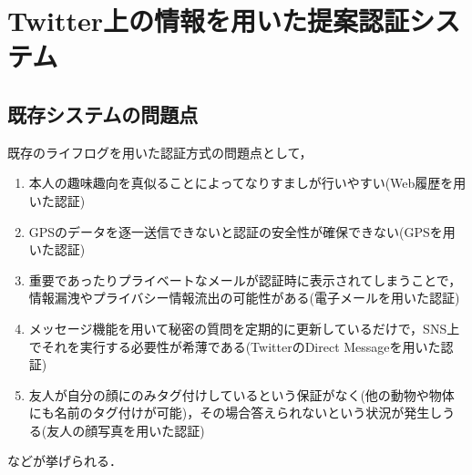 \chapter{Twitter上の情報を用いた提案認証システム}\label{chap:system}
\section{既存システムの問題点}
既存のライフログを用いた認証方式の問題点として，
\begin{enumerate}
\item 本人の趣味趣向を真似ることによってなりすましが行いやすい(Web履歴を用いた認証)
\item GPSのデータを逐一送信できないと認証の安全性が確保できない(GPSを用いた認証)
\item 重要であったりプライベートなメールが認証時に表示されてしまうことで，情報漏洩やプライバシー情報流出の可能性がある(電子メールを用いた認証)
\item メッセージ機能を用いて秘密の質問を定期的に更新しているだけで，SNS上でそれを実行する必要性が希薄である(TwitterのDirect Messageを用いた認証)
\item 友人が自分の顔にのみタグ付けしているという保証がなく(他の動物や物体にも名前のタグ付けが可能)，その場合答えられないという状況が発生しうる(友人の顔写真を用いた認証)
\end{enumerate}
などが挙げられる．

